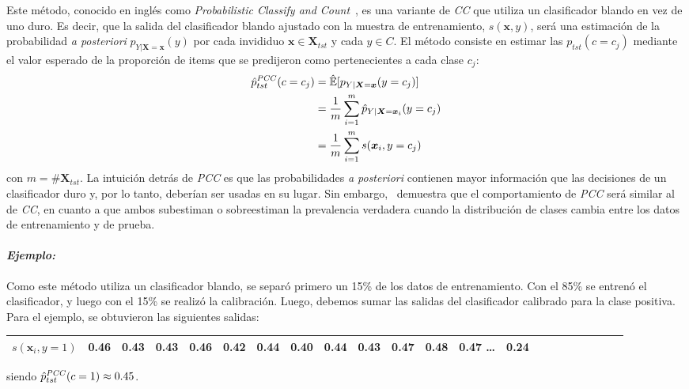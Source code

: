 Este método, conocido en inglés como {\it Probabilistic Classify and
Count\/}~\cite{bella2010quantification, tang2010network}, es una variante de
{\it CC\/} que utiliza un clasificador blando en vez de uno duro. Es decir, que
la salida del clasificador blando ajustado con la muestra de entrenamiento,
$s(\boldsymbol{x}, y)$, será una estimación de la probabilidad {\it a
posteriori\/} ${p}_{Y|\boldsymbol{X}=\boldsymbol{x}}(y)$ por cada invididuo
$\boldsymbol{x} \in \boldsymbol{X}_{tst}$ y cada $y \in C$. El método consiste
en estimar las ${p}_{tst}(c=c_j)$ mediante el valor esperado de la proporción de
items que se predijeron como pertenecientes a cada clase $c_j$:
\begin{align}
\begin{split}
    \hat p^{\it PCC\/}_{tst}(c=c_j) &= \mathbb{\hat E}[p_{Y|\boldsymbol{X}=\boldsymbol{x}}(y=c_j)] \\
    &= \frac{1}{m} \sum \limits_{i=1}^{m}{\hat p_{Y|\boldsymbol{X}=\boldsymbol{x}_i}(y=c_j)} \\
    &= \frac{1}{m} \sum \limits_{i=1}^{m}{s(\boldsymbol{x}_i, y=c_j)}
\end{split}
\end{align}
con $m=\#\boldsymbol{X}_{tst}$. La intuición detrás de {\it PCC\/} es que las
probabilidades {\it a posteriori\/} contienen mayor información que las
decisiones de un clasificador duro y, por lo tanto, deberían ser usadas en su
lugar. Sin embargo,~\citet[Corolario 6, p.157 y p.163]{tasche2014exact}
demuestra que el comportamiento de {\it PCC\/} será similar al de {\it CC}, en
cuanto a que ambos subestiman o sobreestiman la prevalencia verdadera cuando la
distribución de clases cambia entre los datos de entrenamiento y de prueba.

\paragraph{\it Ejemplo:\/} Como este método utiliza un clasificador blando, se
separó primero un 15\% de los datos de entrenamiento. Con el 85\% se entrenó el
clasificador, y luego con el 15\% se realizó la calibración. Luego, debemos
sumar las salidas del clasificador calibrado para la clase positiva. Para el
ejemplo, se obtuvieron las siguientes salidas:
\begin{center}
    \begin{tabular}{lrrrrrrrrrrrrrrrrrrrrr}
        \toprule
        \textbf{$s(\boldsymbol{x}_i, y=1)$} & 0.46 & 0.43 & 0.43 & 0.46 & 0.42 &
        0.44 & 0.40 & 0.44 & 0.43 & 0.47 & 0.48 & 0.47 \ldots & 0.24 \\
        \bottomrule
    \end{tabular}
\end{center}
siendo $\hat p^{\it PCC\/}_{tst}(c=1) \approx 0.45$.

